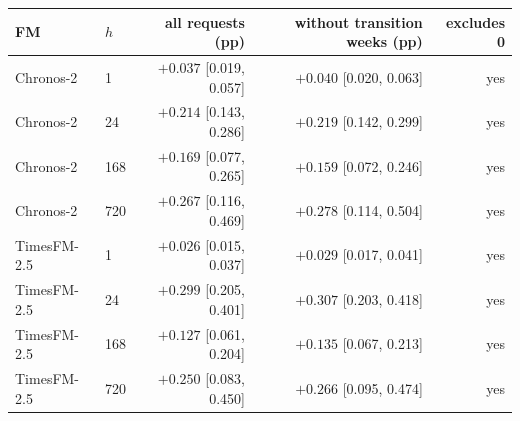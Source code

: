 \begin{tabular}{llrrr}
\toprule
FM & $h$ & all requests (pp) & without transition weeks (pp) & excludes 0 \\
\midrule
Chronos-2 & 1 & $+0.037$ [0.019, 0.057] & $+0.040$ [0.020, 0.063] & yes \\
Chronos-2 & 24 & $+0.214$ [0.143, 0.286] & $+0.219$ [0.142, 0.299] & yes \\
Chronos-2 & 168 & $+0.169$ [0.077, 0.265] & $+0.159$ [0.072, 0.246] & yes \\
Chronos-2 & 720 & $+0.267$ [0.116, 0.469] & $+0.278$ [0.114, 0.504] & yes \\
TimesFM-2.5 & 1 & $+0.026$ [0.015, 0.037] & $+0.029$ [0.017, 0.041] & yes \\
TimesFM-2.5 & 24 & $+0.299$ [0.205, 0.401] & $+0.307$ [0.203, 0.418] & yes \\
TimesFM-2.5 & 168 & $+0.127$ [0.061, 0.204] & $+0.135$ [0.067, 0.213] & yes \\
TimesFM-2.5 & 720 & $+0.250$ [0.083, 0.450] & $+0.266$ [0.095, 0.474] & yes \\
\bottomrule
\end{tabular}

